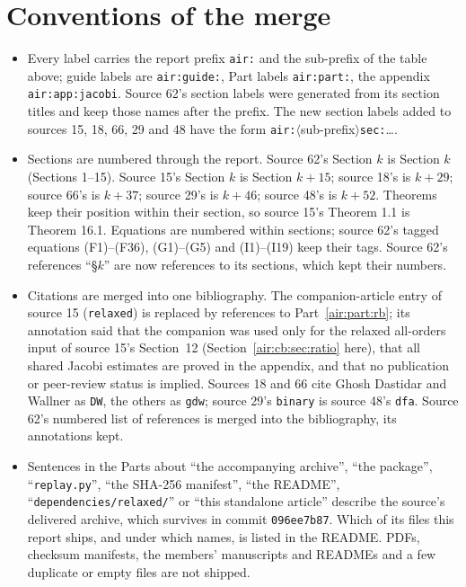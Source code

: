 \documentclass[11pt,letterpaper]{article}
\numberwithin{equation}{section}
\theoremstyle{remark}
\newcommand{\repopath}[1]{\nolinkurl{#1}}
\begin{document}
\section*{Conventions of the merge}
\label{air:guide:conventions}
\begin{itemize}
\item Every label carries the report prefix \texttt{air:} and the sub-prefix of the table above; guide labels are \texttt{air:guide:}, Part labels \texttt{air:part:}, the appendix \texttt{air:app:jacobi}. Source 62's section labels were generated from its section titles and keep those names after the prefix. The new section labels added to sources 15, 18, 66, 29 and 48 have the form \texttt{air:}$\langle$sub-prefix$\rangle$\texttt{sec:}\ldots.
\item Sections are numbered through the report. Source 62's Section $k$ is Section $k$ (Sections 1--15). Source 15's Section $k$ is Section $k+15$; source 18's is $k+29$; source 66's is $k+37$; source 29's is $k+46$; source 48's is $k+52$. Theorems keep their position within their section, so source 15's Theorem 1.1 is Theorem 16.1. Equations are numbered within sections; source 62's tagged equations (F1)--(F36), (G1)--(G5) and (I1)--(I19) keep their tags. Source 62's references ``\S$k$'' are now references to its sections, which kept their numbers.
\item Citations are merged into one bibliography. The companion-article entry of source 15 (\texttt{relaxed}) is replaced by references to Part~\ref{air:part:rb}; its annotation said that the companion was used only for the relaxed all-orders input of source 15's Section~12 (Section~\ref{air:cb:sec:ratio} here), that all shared Jacobi estimates are proved in the appendix, and that no publication or peer-review status is implied. Sources 18 and 66 cite Ghosh Dastidar and Wallner as \texttt{DW}, the others as \texttt{gdw}; source 29's \texttt{binary} is source 48's \texttt{dfa}. Source 62's numbered list of references is merged into the bibliography, its annotations kept.
\item Sentences in the Parts about ``the accompanying archive'', ``the package'', ``\texttt{replay.py}'', ``the SHA-256 manifest'', ``the README'', ``\repopath{dependencies/relaxed/}'' or ``this standalone article'' describe the source's delivered archive, which survives in commit \texttt{096ee7b87}. Which of its files this report ships, and under which names, is listed in the README. PDFs, checksum manifests, the members' manuscripts and READMEs and a few duplicate or empty files are not shipped.
\end{itemize}
\end{document}
